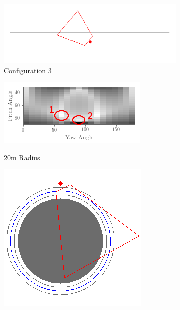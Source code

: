 \documentclass[a4paper,12pt,twoside,openright]{report}
\begin{document}
\begin{figure}[h!]
\begin{subfigure}[b]{0.45\textwidth}
    \centering
    \includegraphics[width=\textwidth]{figures/simple_objective/0_curvature_pos3_small.png}
    \caption{Configuration 3}
\end{subfigure}
\begin{subfigure}[b]{0.45\textwidth}
    \centering
    \includegraphics[width=\textwidth]{figures/simple_objective/pitch_yaw_at_radius_20_annotated.png}
    \label{fig:simpleobjective:0curvature}
    \caption{20m Radius}
\end{subfigure}
\begin{subfigure}[b]{0.25\textwidth}
    \centering
    \includegraphics[width=\textwidth]{figures/simple_objective/radius_20m_pos1_small.png}

\end{subfigure}
\end{figure}
\end{document}
